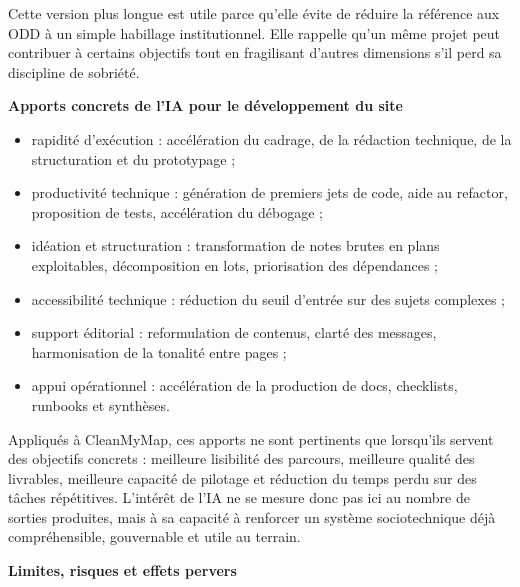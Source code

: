 \documentclass[
  10pt,
  a4paper,
  DIV=11,
  numbers=noendperiod,
  oneside]{scrreprt}
\providecommand{\tightlist}{%
  \setlength{\itemsep}{0pt}\setlength{\parskip}{0pt}}
\let\oldtextbf\textbf
\renewcommand{\textbf}[1]{\oldtextbf{\textcolor{cmmnavy}{#1}}}
\begin{document}
Cette version plus longue est utile parce qu'elle évite de réduire la
référence aux ODD à un simple habillage institutionnel. Elle rappelle
qu'un même projet peut contribuer à certains objectifs tout en
fragilisant d'autres dimensions s'il perd sa discipline de sobriété.

\textbf{Apports concrets de l'IA pour le développement du site}

\begin{itemize}
\tightlist
\item
  rapidité d'exécution : accélération du cadrage, de la rédaction
  technique, de la structuration et du prototypage ;
\item
  productivité technique : génération de premiers jets de code, aide au
  refactor, proposition de tests, accélération du débogage ;
\item
  idéation et structuration : transformation de notes brutes en plans
  exploitables, décomposition en lots, priorisation des dépendances ;
\item
  accessibilité technique : réduction du seuil d'entrée sur des sujets
  complexes ;
\item
  support éditorial : reformulation de contenus, clarté des messages,
  harmonisation de la tonalité entre pages ;
\item
  appui opérationnel : accélération de la production de docs,
  checklists, runbooks et synthèses.
\end{itemize}

Appliqués à CleanMyMap, ces apports ne sont pertinents que lorsqu'ils
servent des objectifs concrets : meilleure lisibilité des parcours,
meilleure qualité des livrables, meilleure capacité de pilotage et
réduction du temps perdu sur des tâches répétitives. L'intérêt de l'IA
ne se mesure donc pas ici au nombre de sorties produites, mais à sa
capacité à renforcer un système sociotechnique déjà compréhensible,
gouvernable et utile au terrain.

\textbf{Limites, risques et effets pervers}
\end{document}
